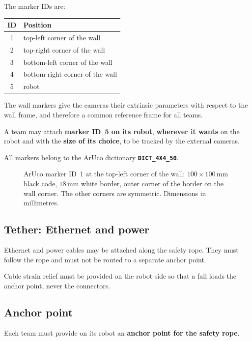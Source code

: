 \documentclass[11pt,a4paper]{article}
\begin{document}
The marker IDs are:

\begin{center}
\small
\begin{tabular}{@{}cl@{}}
\toprule
\textbf{ID} & \textbf{Position}\\
\midrule
1 & top-left corner of the wall\\
2 & top-right corner of the wall\\
3 & bottom-left corner of the wall\\
4 & bottom-right corner of the wall\\
5 & robot\\
\bottomrule
\end{tabular}
\end{center}

The wall markers give the cameras their extrinsic parameters with respect
to the wall frame, and therefore a common reference frame for all teams.

A team may attach \textbf{marker ID~5 on its robot}, \textbf{wherever it wants}
on the robot and with the \textbf{size of its choice}, to be tracked by the
external cameras.

All markers belong to the ArUco dictionary \textbf{\texttt{DICT\_4X4\_50}}.
\begin{figure}[h!]
  \centering
  
  \caption{ArUco marker ID~1 at the top-left corner of the wall: $100\times100$\,mm
           black code, $18$\,mm white border, outer corner of the border on the
           wall corner. The other corners are symmetric. Dimensions in
           millimetres.}
  \label{fig:aruco}
\end{figure}

\subsection{Tether: Ethernet and power}

Ethernet and power cables may be attached along the safety rope. They must
follow the rope and must not be routed to a separate anchor point.

Cable strain relief must be provided on the robot side so that a fall
loads the anchor point, never the connectors.

\subsection{Anchor point}

Each team must provide on its robot an \textbf{anchor point for the safety
rope}.
\end{document}
